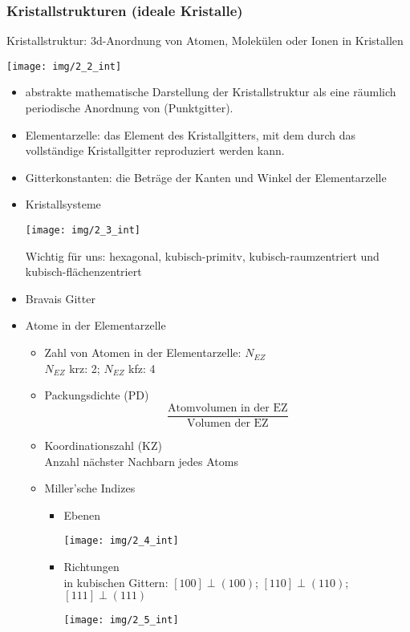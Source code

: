 \subsubsection{Kristallstrukturen (ideale Kristalle)}

Kristallstruktur: 3d-Anordnung von Atomen, Molekülen oder Ionen in Kristallen


\begin{center}
	\texttt{[image: img/2\_2\_int]}
\end{center}

\begin{itemize}
	\item {} abstrakte mathematische Darstellung der Kristallstruktur als eine räumlich periodische Anordnung von  (Punktgitter).
	\item Elementarzelle: das Element des Kristallgitters, mit dem durch  das vollständige Kristallgitter  reproduziert werden kann.
	\item Gitterkonstanten: die Beträge der Kanten und Winkel der Elementarzelle
	\item Kristallsysteme\\
		\begin{center}
			\texttt{[image: img/2\_3\_int]}
		\end{center}
		Wichtig für uns: hexagonal, kubisch-primitv, kubisch-raumzentriert und kubisch-flächenzentriert
	\item Bravais Gitter
	\item Atome in der Elementarzelle
		\begin{itemize}
			\item Zahl von Atomen in der Elementarzelle: $N_{EZ}$\\
				$N_{EZ}$ krz: 2; $N_{EZ}$ kfz: 4
			\item Packungsdichte (PD)\\
				$$\frac{\textrm{Atomvolumen in der EZ}}{\textrm{Volumen der EZ}}$$
			\item Koordinationszahl (KZ)\\
				Anzahl nächster Nachbarn jedes Atoms
			\item Miller'sche Indizes
				\begin{itemize}
					\item Ebenen\\
						\begin{center}
							\texttt{[image: img/2\_4\_int]}
						\end{center}
					\item Richtungen\\
						in kubischen Gittern: $[100] \perp (100)$; $[110] \perp (110)$; $[111] \perp (111)$
						\begin{center}
							\texttt{[image: img/2\_5\_int]}
						\end{center}
				\end{itemize}
		\end{itemize}
\end{itemize}

